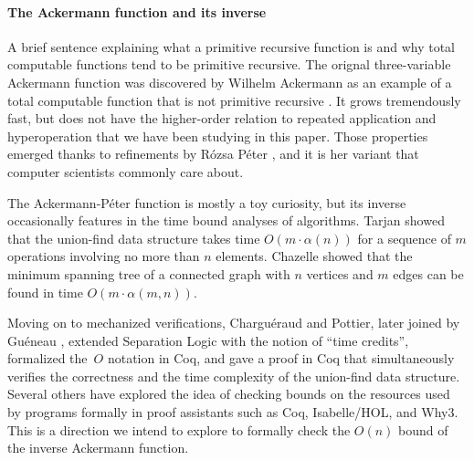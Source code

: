 \paragraph*{The Ackermann function and its inverse}
{\color{magenta}A brief sentence explaining what a primitive recursive function is and 
why total computable functions tend to be primitive recursive.}
The orignal three-variable Ackermann function was discovered by 
Wilhelm Ackermann as an example of a total computable function that 
is not primitive recursive \cite{ackermann}. 
It grows tremendously fast, but does not have the higher-order
relation to repeated application and hyperoperation that we have been studying in
this paper. Those properties emerged thanks to refinements by Rózsa Péter \cite{peter},
and it is her variant that computer scientists commonly care about.

The Ackermann-Péter function is mostly a toy curiosity, but its inverse 
occasionally features in the time bound analyses of algorithms. 
Tarjan \cite{tarjan} showed that the union-find data structure
takes time $O(m\cdot\alpha(n))$ for a sequence of $m$ operations
involving no more than $n$ elements. 
Chazelle \cite{chazelle} showed that the minimum spanning tree
of a connected graph with $n$ vertices and $m$ edges 
can be found in time $O(m\cdot\alpha(m,n))$.

Moving on to mechanized verifications, Charguéraud and Pottier,
\cite{charpott} later joined by Guéneau \cite{gueneauetal}, 
extended Separation Logic with the notion of ``time credits'',
formalized the~$O$ notation in Coq, 
and gave a proof in Coq that simultaneously verifies the correctness
and the time complexity of the union-find data structure. Several others 
\cite{some of the above from google scholar} 
have explored the idea of checking bounds on the resources
used by programs formally in proof assistants such as Coq, Isabelle/HOL, and Why3.
{\color{magenta}This is a direction
we intend to explore to formally check the $O(n)$ bound
of the inverse Ackermann function.}

